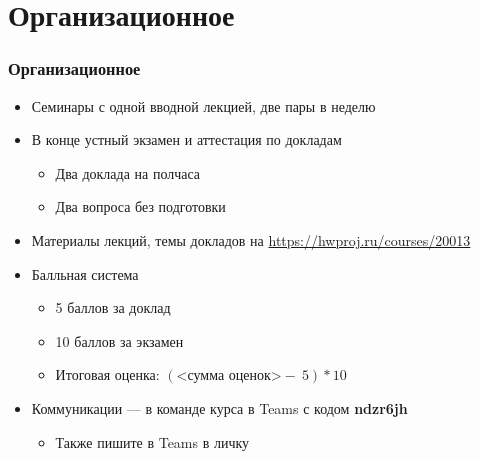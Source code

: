 \documentclass{../../slides-style}
\begin{document}
    \begin{frame}[plain]
        \titlepage
    \end{frame}

    \section{Организационное}

    \begin{frame}
        \frametitle{Организационное}
        \begin{itemize}
            \item Семинары с одной вводной лекцией, две пары в неделю
            \item В конце устный экзамен и аттестация по докладам
            \begin{itemize}
                \item Два доклада на полчаса
                \item Два вопроса без подготовки
            \end{itemize}
            \item Материалы лекций, темы докладов на \url{https://hwproj.ru/courses/20013}
            \item Балльная система
            \begin{itemize}
                \item 5 баллов за доклад
                \item 10 баллов за экзамен
                \item Итоговая оценка: $(\textrm{<сумма оценок>} -\ 5) * 10$
            \end{itemize}
            \item Коммуникации --- в команде курса в Teams с кодом \textbf{ndzr6jh}
            \begin{itemize}
                \item Также пишите в Teams в личку
            \end{itemize}
        \end{itemize}
    \end{frame}
\end{document}
